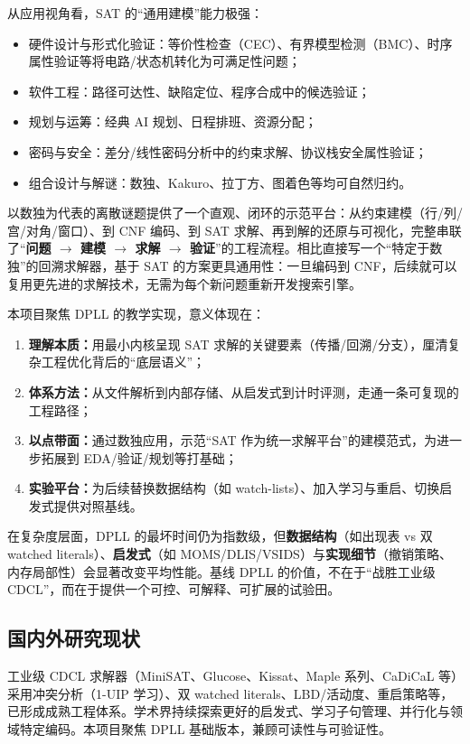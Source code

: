 \documentclass[UTF8]{ctexart}
\begin{document}
从应用视角看，SAT 的“通用建模”能力极强：
\begin{itemize}
  \item 硬件设计与形式化验证：等价性检查（CEC）、有界模型检测（BMC）、时序属性验证等将电路/状态机转化为可满足性问题；
  \item 软件工程：路径可达性、缺陷定位、程序合成中的候选验证；
  \item 规划与运筹：经典 AI 规划、日程排班、资源分配；
  \item 密码与安全：差分/线性密码分析中的约束求解、协议栈安全属性验证；
  \item 组合设计与解谜：数独、Kakuro、拉丁方、图着色等均可自然归约。
\end{itemize}

以数独为代表的离散谜题提供了一个直观、闭环的示范平台：从约束建模（行/列/宫/对角/窗口）、到 CNF 编码、到 SAT 求解、再到解的还原与可视化，完整串联了“\textbf{问题 \(\to\) 建模 \(\to\) 求解 \(\to\) 验证}”的工程流程。相比直接写一个“特定于数独”的回溯求解器，基于 SAT 的方案更具通用性：一旦编码到 CNF，后续就可以复用更先进的求解技术，无需为每个新问题重新开发搜索引擎。

本项目聚焦 DPLL 的教学实现，意义体现在：
\begin{enumerate}
  \item \textbf{理解本质：}用最小内核呈现 SAT 求解的关键要素（传播/回溯/分支），厘清复杂工程优化背后的“底层语义”；
  \item \textbf{体系方法：}从文件解析到内部存储、从启发式到计时评测，走通一条可复现的工程路径；
  \item \textbf{以点带面：}通过数独应用，示范“SAT 作为统一求解平台”的建模范式，为进一步拓展到 EDA/验证/规划等打基础；
  \item \textbf{实验平台：}为后续替换数据结构（如 watch-lists）、加入学习与重启、切换启发式提供对照基线。
\end{enumerate}

在复杂度层面，DPLL 的最坏时间仍为指数级，但\textbf{数据结构}（如出现表 vs 双 watched literals）、\textbf{启发式}（如 MOMS/DLIS/VSIDS）与\textbf{实现细节}（撤销策略、内存局部性）会显著改变平均性能。基线 DPLL 的价值，不在于“战胜工业级 CDCL”，而在于提供一个可控、可解释、可扩展的试验田。

\subsection{国内外研究现状}
工业级 CDCL 求解器（MiniSAT、Glucose、Kissat、Maple 系列、CaDiCaL 等）采用冲突分析（1-UIP 学习）、双 watched literals、LBD/活动度、重启策略等，已形成成熟工程体系。学术界持续探索更好的启发式、学习子句管理、并行化与领域特定编码。本项目聚焦 DPLL 基础版本，兼顾可读性与可验证性。
\end{document}
